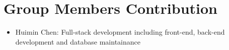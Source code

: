 \section{Group Members Contribution}

\begin{itemize}
    \item Huimin Chen: Full-stack development including front-end, back-end development and database maintainance  
\end{itemize}